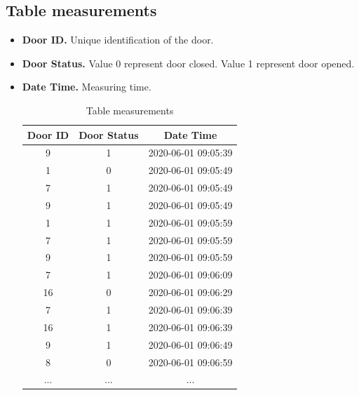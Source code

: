 \begin{itemize}
 \begin{table}
 \centering
 \caption{Task Table in Database}
 \label{tab:db_task_table}
 \end{table}
\end{itemize}

\subsection*{Table measurements}
\begin{itemize}
 \item \textbf{Door ID.} Unique identification of the door.
 \item \textbf{Door Status.} Value 0 represent door closed. Value 1 represent door opened.
 \item \textbf{Date Time.} Measuring time.
 \begin{table}
 \centering
 \begin{tabular}{|c| c| c|} 
 \hline
 Door ID & Door Status & Date Time \\
 \hline
 9 & 1 & 2020-06-01 09:05:39 \\ \hline
 1 & 0 & 2020-06-01 09:05:49 \\ \hline
 7 & 1 & 2020-06-01 09:05:49 \\ \hline
 9 & 1 & 2020-06-01 09:05:49 \\ \hline
 1 & 1 & 2020-06-01 09:05:59 \\ \hline
 7 & 1 & 2020-06-01 09:05:59 \\ \hline
 9 & 1 & 2020-06-01 09:05:59 \\ \hline
 7 & 1 & 2020-06-01 09:06:09 \\ \hline
 16 & 0 & 2020-06-01 09:06:29 \\ \hline
 7 & 1 & 2020-06-01 09:06:39 \\ \hline
 16 & 1 & 2020-06-01 09:06:39 \\ \hline
 9 & 1 & 2020-06-01 09:06:49 \\ \hline
 8 & 0 & 2020-06-01 09:06:59 \\ \hline
 ... & ...& ... \\ \hline
 \end{tabular}
 \caption{Table measurements}
 \label{tab:db_measurement_result}
 \end{table}
\end{itemize}

